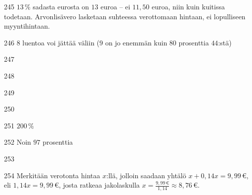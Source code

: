 \begin{Vastaus}{245}
         $13\,\%$ sadasta eurosta on $13$ euroa -- ei $11,50$ euroa, niin kuin kuitissa todetaan. Arvonlisävero lasketaan suhteessa verottomaan hintaan, ei lopulliseen myyntihintaan.
    
\end{Vastaus}
\begin{Vastaus}{246}
	$8$ luentoa voi jättää väliin ($9$ on jo enemmän kuin $80$ prosenttia $44$:stä)
	
\end{Vastaus}
\begin{Vastaus}{247}
    
\end{Vastaus}
\begin{Vastaus}{248}
	
\end{Vastaus}
\begin{Vastaus}{249}
    
\end{Vastaus}
\begin{Vastaus}{250}
    
\end{Vastaus}
\begin{Vastaus}{251}
        $200\,\%$
    
\end{Vastaus}
\begin{Vastaus}{252}
Noin $97$ prosenttia
	
\end{Vastaus}
\begin{Vastaus}{253}
	
\end{Vastaus}
\begin{Vastaus}{254}
	Merkitään verotonta hintaa $x$:llä, jolloin saadaan yhtälö $x+0,14x=9,99\,€$, eli $1,14x=9,99\,€$, josta ratkeaa jakolaskulla $x=\frac{9,99\,€}{1,14}\approx 8,76\,€$.
	
\end{Vastaus}
